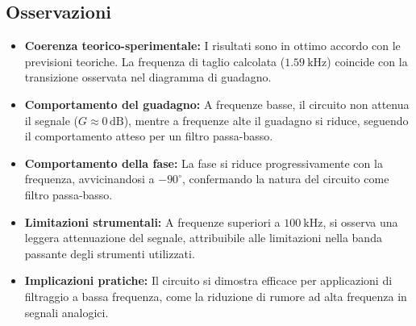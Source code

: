 \documentclass[a4paper,12pt]{article}
\begin{document}
\subsection{Osservazioni}
\begin{itemize}
    \item \textbf{Coerenza teorico-sperimentale:} I risultati sono in ottimo accordo con le previsioni teoriche. La frequenza di taglio calcolata (\(\SI{1.59}{\kilo\hertz}\)) coincide con la transizione osservata nel diagramma di guadagno.
    \item \textbf{Comportamento del guadagno:} A frequenze basse, il circuito non attenua il segnale (\(G \approx 0 \, \si{\deci\bel}\)), mentre a frequenze alte il guadagno si riduce, seguendo il comportamento atteso per un filtro passa-basso.
    \item \textbf{Comportamento della fase:} La fase si riduce progressivamente con la frequenza, avvicinandosi a \(-90^\circ\), confermando la natura del circuito come filtro passa-basso.
    \item \textbf{Limitazioni strumentali:} A frequenze superiori a \(\SI{100}{\kilo\hertz}\), si osserva una leggera attenuazione del segnale, attribuibile alle limitazioni nella banda passante degli strumenti utilizzati.
    \item \textbf{Implicazioni pratiche:} Il circuito si dimostra efficace per applicazioni di filtraggio a bassa frequenza, come la riduzione di rumore ad alta frequenza in segnali analogici.
\end{itemize}

\end{document}
